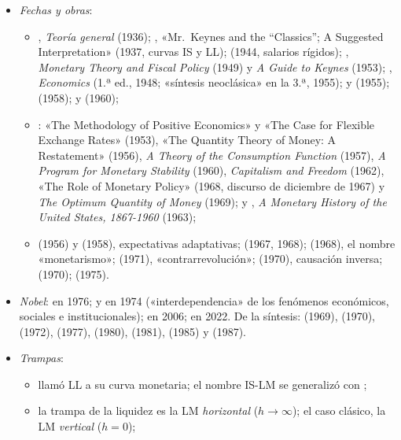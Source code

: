 \documentclass[11pt]{article}
\begin{document}
\begin{itemize}
\item \emph{Fechas y obras}:
  \begin{itemize}
  \item {}, \emph{Teoría general} (1936); , «Mr.~Keynes and the ``Classics''; A Suggested Interpretation» (1937, curvas IS y LL);  (1944, salarios rígidos); , \emph{Monetary Theory and Fiscal Policy} (1949) y \emph{A Guide to Keynes} (1953); , \emph{Economics} (1.ª ed., 1948; «síntesis neoclásica» en la 3.ª, 1955);  y  (1955);  (1958);  y  (1960);
  \item {}: «The Methodology of Positive Economics» y «The Case for Flexible Exchange Rates» (1953), «The Quantity Theory of Money: A Restatement» (1956), \emph{A Theory of the Consumption Function} (1957), \emph{A Program for Monetary Stability} (1960), \emph{Capitalism and Freedom} (1962), «The Role of Monetary Policy» (1968, discurso de diciembre de 1967) y \emph{The Optimum Quantity of Money} (1969);  y , \emph{A Monetary History of the United States, 1867-1960} (1963);
  \item {} (1956) y  (1958), expectativas adaptativas;  (1967, 1968);  (1968), el nombre «monetarismo»;  (1971), «contrarrevolución»;  (1970), causación inversa;  (1970);  (1975).
  \end{itemize}
\item \emph{Nobel}:  en 1976;  y  en 1974 («interdependencia» de los fenómenos económicos, sociales e institucionales);  en 2006;  en 2022\nocite{Nobel1976Friedman,Nobel1974,Nobel2022}. De la síntesis:  (1969),  (1970),  (1972),  (1977),  (1980),  (1981),  (1985) y  (1987).
\item \emph{Trampas}:
  \begin{itemize}
  \item {} llamó LL a su curva monetaria; el nombre IS-LM se generalizó con ;
  \item la trampa de la liquidez es la LM \emph{horizontal} ($h\to\infty$); el caso clásico, la LM \emph{vertical} ($h=0$);

\end{itemize}
\end{itemize}
\end{document}
